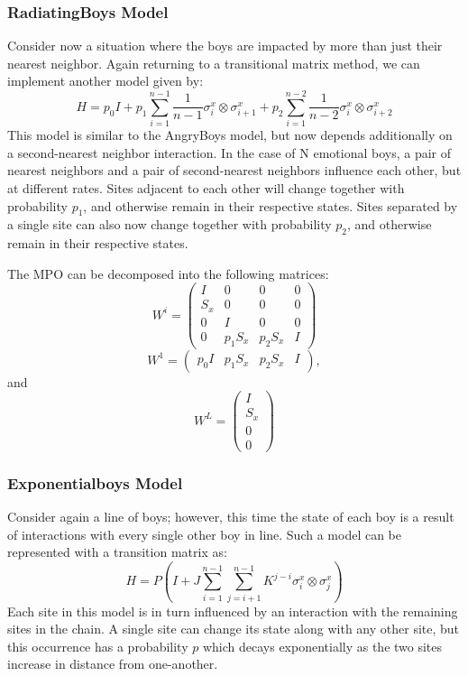 \documentclass[english]{article}[12pt]
\begin{document}
\subsubsection{RadiatingBoys Model}
Consider now a situation where the boys are impacted by more than just their nearest neighbor. Again returning to a transitional matrix method, we can implement another model given by:
\begin{displaymath}
H=p_0 I + p_1 \sum_{i=1}^{n-1}\frac{1}{n-1}\sigma_i^x\otimes\sigma_{i+1}^x + p_2 \sum_{i=1}^{n-2}\frac{1}{n-2}\sigma_i^x\otimes\sigma_{i+2}^x
\end{displaymath}
This model is similar to the AngryBoys model, but now depends additionally on a second-nearest neighbor interaction. In the case of N emotional boys, a pair of nearest neighbors and a pair of second-nearest neighbors influence each other, but at different rates. Sites adjacent to each other will change together with probability $p_{1}$, and otherwise remain in their respective states. Sites separated by a single site can also now change together with  probability $p_{2}$, and otherwise remain in their respective states.


The MPO can be decomposed into the following matrices:
$$
W^{i}=
\begin{pmatrix}
I & 0 & 0 & 0 \\
S_x & 0 & 0 & 0 \\
0 & I & 0 & 0 \\
0 & p_1 S_x & p_2 S_x & I
\end{pmatrix}
$$
 $$W^1=\begin{pmatrix}p_0 I & p_1 S_x & p_2 S_x & I\end{pmatrix}, $$ 
and 
$$W^L=
\begin{pmatrix}
I \\ S_x \\ 0 \\0
\end{pmatrix}$$


\subsubsection{Exponentialboys Model}
Consider again a line of boys; however, this time the state of each boy is a result of interactions with every single other boy in line. Such a model can be represented with a  transition matrix as:
\begin{displaymath}
H = P (I + J \sum_{i=1}^{n-1} \sum_{j=i+1}^{n-1} K^{j-i}\sigma_i^x\otimes\sigma_j^x)
\end{displaymath}
Each site in this model is in turn influenced by an interaction with the remaining sites in the chain. A single site can change its state along with any other site, but this occurrence has a probability $p$ which decays exponentially as the two sites increase in distance from one-another.
\end{document}
